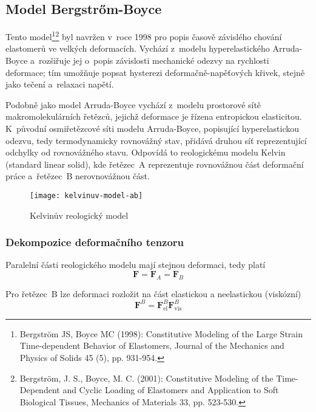 
\subsection{Model Bergstrőm-Boyce}\label{sec:bergstrom-boyce}
Tento model\footnote{Bergström JS, Boyce MC (1998):  Constitutive Modeling of the Large Strain Time-dependent Behavior of Elastomers, Journal of the Mechanics and Physics of Solids 45 (5), pp. 931-954.}\footnote{Bergström, J. S., Boyce, M. C. (2001): Constitutive Modeling of the Time-Dependent and Cyclic Loading of Elastomers and Application to Soft Biological Tissues, Mechanics of Materials 33, pp. 523-530.} byl navržen v~roce 1998 pro popis časově závislého chování elastomerů ve velkých deformacích.
Vychází z~modelu hyperelastického Arruda-Boyce a~rozšiřuje jej o~popis závislosti mechanické odezvy na rychlosti deformace;
tím umožňuje popsat hysterezi deformačně-napěťových křivek, stejně jako tečení a~relaxaci napětí.

Podobně jako model Arruda-Boyce vychází z~modelu prostorové sítě makromolekulárních řetězců, jejichž deformace je řízena entropickou elasticitou.
K~původní osmiřetězcové síti modelu Arruda-Boyce, popisující hyperelastickou odezvu, tedy termodynamicky rovnovážný stav, přidává druhou síť reprezentující odchylky od rovnovážného stavu.
Odpovídá to reologickému modelu Kelvin (standard linear solid), kde řetězec~A reprezentuje rovnovážnou část deformační práce a~řetězec~B nerovnovážnou část.
\begin{figure}[H]
	\centering
	\texttt{[image: kelvinuv-model-ab]}
	\caption{Kelvinův reologický model}
	\label{fig:kelvinuv-model-ab}
\end{figure}

\subsubsection{Dekompozice deformačního tenzoru}
Paralelní části reologického modelu mají stejnou deformaci, tedy platí
\begin{equation}
	\bm{F} = \bm{F}_A = \bm{F}_B
\end{equation}

Pro řetězec~B lze deformaci rozložit na část elastickou a neelastickou (viskózní)
\begin{equation}
	\bm{F}^B = \bm{F}^B_\text{el} \bm{F}^B_\text{vis}
\end{equation}

